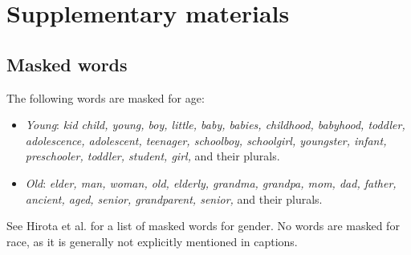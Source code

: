 \newpage
\appendix
\section{Supplementary materials}
\subsection{Masked words} \label{app:masked-words}
The following words are masked for age:
\begin{itemize}
    \item \textit{Young}: \textit{kid child, young, boy, little, baby, babies, childhood, babyhood, toddler, adolescence, adolescent, teenager, schoolboy, schoolgirl, youngster, infant, preschooler, toddler, student, girl,} and their plurals.
    \item \textit{Old}: \textit{elder, man, woman, old, elderly, grandma, grandpa, mom, dad, father, ancient, aged, senior, grandparent, senior,} and their plurals.
\end{itemize}
See Hirota et al. \cite{hirota} for a list of masked words for gender. No words are masked for race, as it is generally not explicitly mentioned in captions.